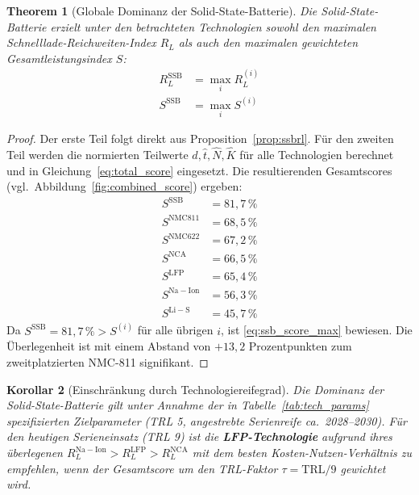 ﻿\documentclass[12pt,a4paper]{article}
\newtheorem{theorem}{Theorem}[section]
\newtheorem{corollary}[theorem]{Korollar}
\begin{document}
	\begin{theorem}[Globale Dominanz der Solid-State-Batterie]
		\label{thm:ssb_dominance}
		Die Solid-State-Batterie erzielt unter den betrachteten Technologien
		sowohl den maximalen Schnelllade-Reichweiten-Index $R_L$ als auch
		den maximalen gewichteten Gesamtleistungsindex $S$:
		\begin{align}
			R_L^{\mathrm{SSB}} &= \max_i R_L^{(i)}
			\label{eq:ssb_rl_max} \\
			S^{\mathrm{SSB}}   &= \max_i S^{(i)}
			\label{eq:ssb_score_max}
		\end{align}
	\end{theorem}

	\begin{proof}
		Der erste Teil folgt direkt aus Proposition~\ref{prop:ssbrl}.
		Für den zweiten Teil werden die normierten Teilwerte
		$\hat{d}, \hat{t}, \hat{N}, \hat{K}$ für alle Technologien
		berechnet und in Gleichung~\eqref{eq:total_score} eingesetzt.
		Die resultierenden Gesamtscores (vgl.\ Abbildung~\ref{fig:combined_score})
		ergeben:
		\begin{align*}
			S^{\mathrm{SSB}}   &= 81{,}7\,\% \\
			S^{\mathrm{NMC811}}&= 68{,}5\,\% \\
			S^{\mathrm{NMC622}}&= 67{,}2\,\% \\
			S^{\mathrm{NCA}}   &= 66{,}5\,\% \\
			S^{\mathrm{LFP}}   &= 65{,}4\,\% \\
			S^{\mathrm{Na-Ion}}&= 56{,}3\,\% \\
			S^{\mathrm{Li-S}}  &= 45{,}7\,\%
		\end{align*}
		Da $S^{\mathrm{SSB}} = 81{,}7\,\% > S^{(i)}$ für alle übrigen
		$i$, ist \eqref{eq:ssb_score_max} bewiesen. Die Überlegenheit ist
		mit einem Abstand von $+13{,}2$ Prozentpunkten zum zweitplatzierten
		NMC-811 signifikant.
	\end{proof}

	\begin{corollary}[Einschränkung durch Technologiereifegrad]
		\label{cor:trl}
		Die Dominanz der Solid-State-Batterie gilt unter Annahme der in
		Tabelle~\ref{tab:tech_params} spezifizierten Zielparameter (TRL 5,
		angestrebte Serienreife ca.\ 2028--2030). Für den heutigen
		Serieneinsatz (TRL 9) ist die \textbf{LFP-Technologie} aufgrund
		ihres überlegenen $R_L^{\mathrm{Na-Ion}} > R_L^{\mathrm{LFP}} >
		R_L^{\mathrm{NCA}}$ mit dem besten Kosten-Nutzen-Verhältnis
		zu empfehlen, wenn der Gesamtscore um den TRL-Faktor
		$\tau = \mathrm{TRL}/9$ gewichtet wird.
	\end{corollary}
\end{document}
